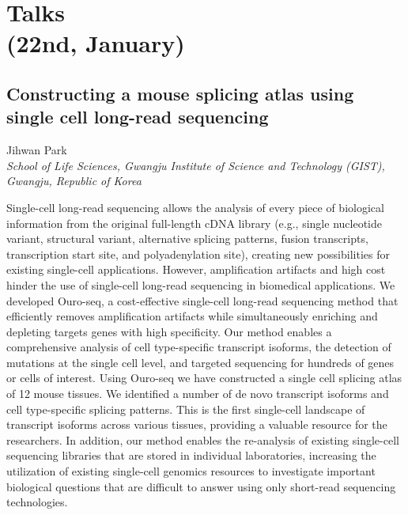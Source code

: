 \chapter[Talks (22nd, January)]{Talks\\(22nd, January)}

\section*{Constructing a mouse splicing atlas using single cell long-read sequencing}

\begin{center}
Jihwan Park \\
\vspace{0.2cm}
\textit{School of Life Sciences, Gwangju Institute of Science and Technology (GIST), Gwangju, Republic of Korea} \\
\end{center}

\noindent
Single-cell long-read sequencing allows the analysis of every piece of biological information from the original full-length cDNA library (e.g., single nucleotide variant, structural variant, alternative splicing patterns, fusion transcripts, transcription start site, and polyadenylation site), creating new possibilities for existing single-cell applications. However, amplification artifacts and high cost hinder the use of single-cell long-read sequencing in biomedical applications. We developed Ouro-seq, a cost-effective single-cell long-read sequencing method that efficiently removes amplification artifacts while simultaneously enriching and depleting targets genes with high specificity. Our method enables a comprehensive analysis of cell type-specific transcript isoforms, the detection of mutations at the single cell level, and targeted sequencing for hundreds of genes or cells of interest. Using Ouro-seq we have constructed a single cell splicing atlas of 12 mouse tissues. We identified a number of de novo transcript isoforms and cell type-specific splicing patterns. This is the first single-cell landscape of transcript isoforms across various tissues, providing a valuable resource for the researchers. In addition, our method enables the re-analysis of existing single-cell sequencing libraries that are stored in individual laboratories, increasing the utilization of existing single-cell genomics resources to investigate important biological questions that are difficult to answer using only short-read sequencing technologies.
\newpage

